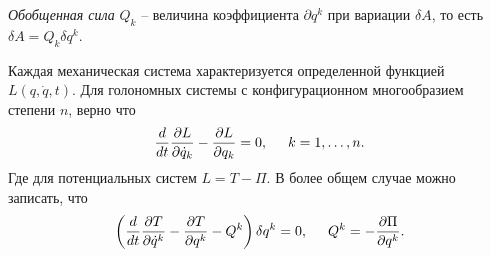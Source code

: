 \begin{to_def} 
    \textit{Обобщенная сила} $Q_k$ -- величина коэффициента $\partial q^k$ при вариации $\delta A$, то есть $\delta A = Q_k \delta q^k$.
\end{to_def}

\begin{to_thr}
     Каждая механическая система характеризуется определенной функцией $L(q, \dot{q}, t)$. Для голономных системы с конфигурационном многообразием степени $n$, верно что
     \begin{equation*}
         \frac{d}{dt} \frac{\partial L}{\partial \dot{q}_k} - \frac{\partial L}{\partial q_k} = 0, \hspace{0.5cm} k = 1, \ldots, n.
     \end{equation*}
     Где для потенциальных систем $L = T - \Pi$. В более общем случае можно записать, что
     \begin{equation*}
         \left(\frac{d }{d t} \frac{\partial T}{\partial \dot{q}^k} - \frac{\partial T}{\partial q^k} - Q^k\right)\delta q^k = 0, \hspace{0.5cm} 
         Q^k = - \frac{\partial \Pi}{\partial q^k}.
     \end{equation*}
\end{to_thr}

